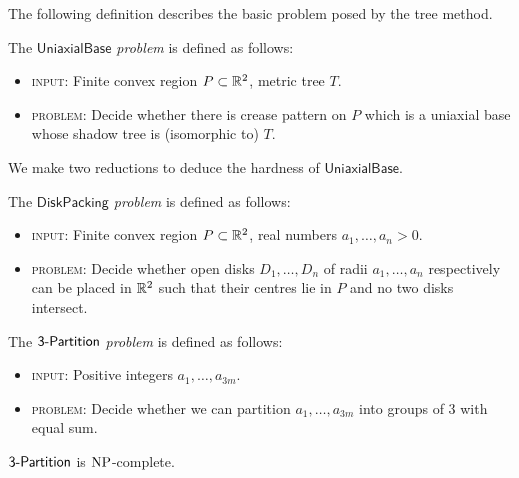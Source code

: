 The following definition describes the basic problem posed by the tree
method.

\newcommand{\UniaxialBase}{\mathsf{UniaxialBase}}

\begin{definition}
  The \emph{$\UniaxialBase$ problem} is defined as follows:
  \begin{itemize}
  \item \textsc{input}: Finite convex region $P \subset \mathbb{R}^2$, metric
    tree $T$.
  \item \textsc{problem}: Decide whether there is crease pattern on
    $P$ which is a uniaxial base whose shadow tree is (isomorphic to)
    $T$.
  \end{itemize}
\end{definition}

We make two reductions to deduce the hardness of $\UniaxialBase$.

\newcommand{\DiskPacking}{\mathsf{DiskPacking}}

\begin{definition}
  The \emph{$\DiskPacking$ problem} is defined as follows:
  \begin{itemize}
  \item \textsc{input}: Finite convex region $P \subset \mathbb{R}^2$, real
    numbers $a_1,\ldots,a_n > 0$.
  \item \textsc{problem}: Decide whether open disks $D_1,\ldots,D_n$
    of radii $a_1,\ldots,a_n$ respectively can be placed in $\mathbb{R}^2$
    such that their centres lie in $P$ and no two disks intersect.
  \end{itemize}
\end{definition}

\newcommand{\ThreePartition}{\mathsf{3\dash Partition}}

\begin{definition}
  The \emph{$\ThreePartition$ problem} is defined as follows:
  \begin{itemize}
  \item \textsc{input}: Positive integers $a_1,\ldots,a_{3m}$.
  \item \textsc{problem}: Decide whether we can partition
    $a_1,\ldots,a_{3m}$ into groups of $3$ with equal sum.
  \end{itemize}
\end{definition}

\begin{proposition}
  $\ThreePartition$ is $\mathrm{NP}$-complete.
\end{proposition}

